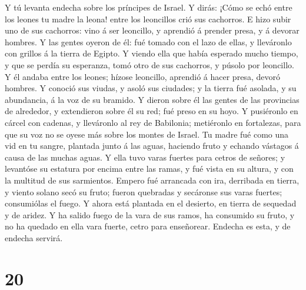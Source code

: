  Y tú levanta endecha sobre los príncipes de Israel.
 Y dirás: ¡Cómo se echó entre los leones tu madre la leona!
entre los leoncillos crió sus cachorros.  E hizo subir uno
de sus cachorros: vino á ser leoncillo, y aprendió á prender presa, y á
devorar hombres.  Y las gentes oyeron de él: fué tomado con
el lazo de ellas, y lleváronlo con grillos á la tierra de Egipto.
 Y viendo ella que había esperado mucho tiempo, y que se
perdía su esperanza, tomó otro de sus cachorros, y púsolo por leoncillo.
 Y él andaba entre los leones; hízose leoncillo, aprendió á
hacer presa, devoró hombres.  Y conoció sus viudas, y asoló
sus ciudades; y la tierra fué asolada, y su abundancia, á la voz de su
bramido.  Y dieron sobre él las gentes de las provincias de
alrededor, y extendieron sobre él su red; fué preso en su hoyo.
 Y pusiéronlo en cárcel con cadenas, y lleváronlo al rey de
Babilonia; metiéronlo en fortalezas, para que su voz no se oyese más
sobre los montes de Israel.  Tu madre fué como una vid en
tu sangre, plantada junto á las aguas, haciendo fruto y echando vástagos
á causa de las muchas aguas.  Y ella tuvo varas fuertes
para cetros de señores; y levantóse su estatura por encima entre las
ramas, y fué vista en su altura, y con la multitud de sus sarmientos.
 Empero fué arrancada con ira, derribada en tierra, y
viento solano secó su fruto; fueron quebradas y secáronse sus varas
fuertes; consumiólas el fuego.  Y ahora está plantada en el
desierto, en tierra de sequedad y de aridez.  Y ha salido
fuego de la vara de sus ramos, ha consumido su fruto, y no ha quedado en
ella vara fuerte, cetro para enseñorear. Endecha es esta, y de endecha
servirá.

\hypertarget{section-19}{%
\section{20}\label{section-19}}

